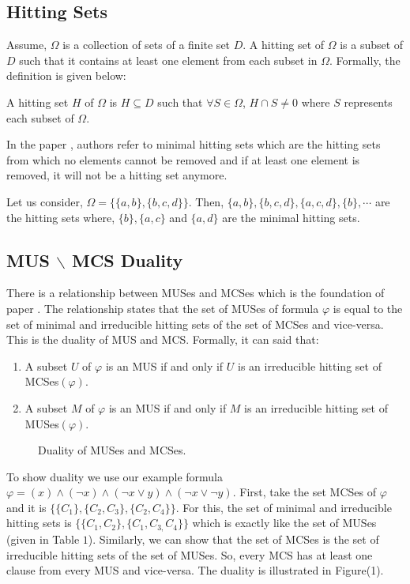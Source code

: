 \subsection{Hitting Sets}
Assume, $\Omega$ is a collection of sets of a finite set $D$. A hitting set of $\Omega$ is a subset of $D$ such that it contains at least one element from each subset in $\Omega$. Formally, the definition is given below:
\begin{definition}
A hitting set $H$ of $\Omega$ is $H\subseteq D$ such that $\forall S\in \Omega$, $H\cap S\neq 0$ where $S$ represents each subset of $\Omega$.
\end{definition}
In the paper \cite{karem}, authors refer to minimal hitting sets which are the hitting sets from which no elements cannot be removed and if at least one element is removed, it will not be a hitting set anymore.\newline
\begin{example}
Let us consider, $\Omega=\{\{a, b\}, \{b, c, d\}\}$. Then, $\{a,b\}, \{b,c,d\}, \{a,c,d\}, \{b\},\cdots$ are the hitting sets where, $\{b\}, \{a,c\} $ and $ \{a,d\}$ are the minimal hitting sets.	
\end{example}
\subsection{MUS $\backslash$ MCS Duality}
There is a relationship between MUSes and MCSes which is the foundation of paper \cite{karem}. The relationship states that the set of MUSes of formula $\varphi$ is equal to the set of minimal and irreducible hitting sets of the set of MCSes and vice-versa. This is the duality of MUS and MCS. Formally, it can said that:
\begin{enumerate}
	\item A subset $U$ of $\varphi$ is an MUS if and only if $U$ is an irreducible hitting set of MCSes$(\varphi)$.
	\item A subset $M$ of $\varphi$ is an MUS if and only if $M$ is an irreducible hitting set of MUSes$(\varphi)$.
\end{enumerate}
\begin{figure}[htb] %
	\begin{center}
		
	\end{center}
	\caption{Duality of MUSes and MCSes.}
	\label{fig:graph}
\end{figure}
To show duality we use our example formula $\varphi=(x)\wedge(\neg x)\wedge(\neg x\vee y)\wedge(\neg x \vee \neg y)$. First, take the set MCSes of $\varphi$ and it is $\{\{C_{1}\}, \{C_{2}, C_{3}\}, \{C_{2}, C_{4}\}\}$. For this, the set of minimal and irreducible hitting sets is $\{\{C_{1}, C_{2}\}, \{C_{1}, C_{3,} C_{4}\}\}$ which is exactly like the set of MUSes (given in Table $1$). Similarly, we can show that the set of MCSes is the set of irreducible hitting sets of the set of MUSes. So, every MCS has at least one clause from every MUS and vice-versa. The duality is illustrated in Figure(1).

